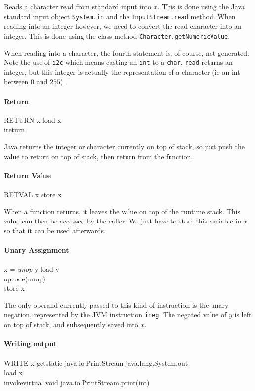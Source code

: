 \documentclass[a4paper]{article}
\begin{document}
Reads a character read from standard input into $x$. This is done using the
Java standard input object \texttt{System.in} and the \texttt{InputStream.read} method. When reading into an integer however, we need to convert the read character into an integer. This is done using the class method \texttt{Character.getNumericValue}.

When reading into a character, the fourth statement is, of course, not
generated. Note the use of \texttt{i2c} which means casting an \texttt{int} to
a \texttt{char}. \texttt{read} returns an integer, but this integer is
actually the representation of a character (ie an int between $0$ and $255$).

\paragraph{Return\\}
\translate
{RETURN x}
{
load x\\
ireturn
}

Java returns the integer or character currently on top of stack, so just push
the value to return on top of stack, then return from the function.

\paragraph{Return Value\\}
\translate
{RETVAL x}
{store x}

When a function returns, it leaves the value on top of the runtime stack. This
value can then be accessed by the caller. We just have to store this variable
in $x$ so that it can be used afterwards.

\paragraph{Unary Assignment\\}
\translate
{x = \textsl{unop} y}
{
load y\\
opcode(unop)\\
store x
}

The only operand currently passed to this kind of instruction is the unary
negation, represented by the JVM instruction \texttt{ineg}. The negated value
of $y$ is left on top of stack, and subsequently saved into $x$.

\paragraph{Writing output\\}
\translate
{WRITE x}
{
getstatic java.io.PrintStream java.lang.System.out\\
load x\\
invokevirtual void java.io.PrintStream.print(int)
}
\end{document}
